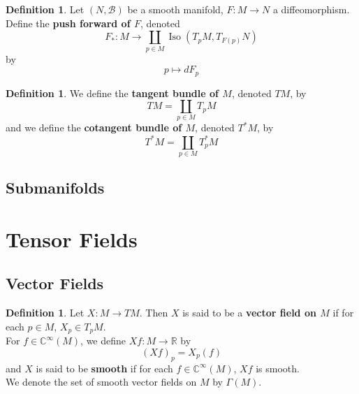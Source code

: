 \documentclass[12pt]{amsart}
\theoremstyle{definition}
\newtheorem{defn}[definition]{Definition}
\theoremstyle{definition}
\newcommand{\Gam}{\Gamma}
\newcommand{\C}{\mathbb{C}}
\newcommand{\R}{\mathbb{R}}
\newcommand{\MB}{\mathcal{B}}
\DeclareMathOperator{\iso}{Iso}
\begin{document}
	\begin{defn}
		Let $(N, \MB)$ be a smooth manifold, $F: M \rightarrow N$ a diffeomorphism. Define the \textbf{push forward of $F$}, denoted $$F_*:M \rightarrow \coprod_{p \in M} \iso(T_pM, T_{F(p)}N)$$ by $$p \mapsto dF_p$$
	\end{defn}
	
		\begin{defn}
		We define the \textbf{tangent bundle of $M$}, denoted $TM$, by $$TM = \coprod_{p \in M} T_pM$$ 
		and we define the \textbf{cotangent bundle of $M$}, denoted $T^*M$, by 
		$$T^*M = \coprod_{p \in M} T_p^*M$$
	\end{defn}
	
	
	\newpage	
	
	
	
	
	
	
	
	
	
	
	
	
	
	
	
	
	
	
	
	
	\subsection{Submanifolds}
	
	\newpage
	
	
	
	
	
	
	
	
	
	
	
	
	
	
	
	
	\section{Tensor Fields}

	
	\subsection{Vector Fields}
	
	\begin{defn}
		Let $X: M \rightarrow TM$. Then $X$ is said to be a \textbf{vector field on $M$} if for each $p \in M$, $X_p \in T_p M$. \\
		For $f \in \C^{\infty}(M)$, we define $Xf : M \rightarrow \R$ by $$(Xf)_p = X_p(f)$$ 
		and $X$ is said to be \textbf{smooth} if for each $f \in \C^{\infty}(M)$, $Xf$ is smooth.\\
		We denote the set of smooth vector fields on $M$ by $\Gam(M)$.
	\end{defn}
\end{document}
